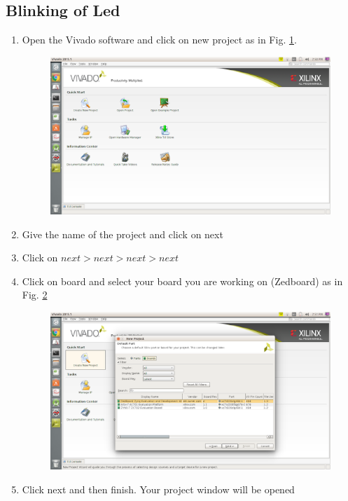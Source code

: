 \documentclass[journal,12pt,twocolumn]{IEEEtran}
\begin{document}
\subsection{Blinking of Led}
\begin{enumerate}
    \item Open the Vivado software and click on new project as in Fig. \ref{fig:New Project}.
    
    \begin{figure}[h]
    \centering
    \includegraphics[scale=.4]{vivado1.eps}
    \caption{}
    \label{fig:New Project}
\end{figure}
    \item Give the name of the project and click on next
    \item Click on $next > next>next>next$
    \item Click on board and select your board you are working on (Zedboard) as in Fig. \ref{fig:Board} 
    
     \begin{figure}[h]
    \centering
    \includegraphics[scale=.4]{vivado3.eps}
\caption{}    
    \label{fig:Board}
\end{figure}
    \item Click next and then finish. Your project window will be opened 
    

\end{enumerate}
\end{document}
